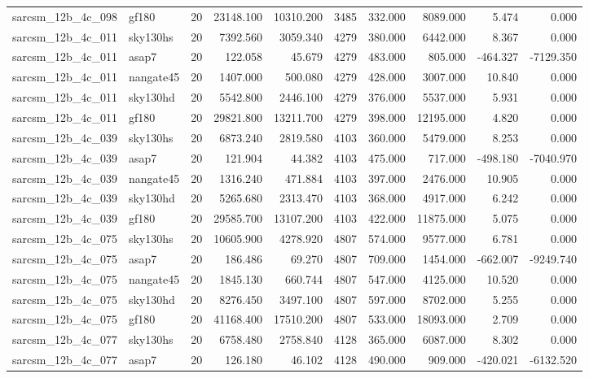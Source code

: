 \begin{tabular}{llrrrrrrrr}
sarcsm\_12b\_4c\_098 & gf180 & 20 & 23148.100 & 10310.200 & 3485 & 332.000 & 8089.000 & 5.474 & 0.000 \\
sarcsm\_12b\_4c\_011 & sky130hs & 20 & 7392.560 & 3059.340 & 4279 & 380.000 & 6442.000 & 8.367 & 0.000 \\
sarcsm\_12b\_4c\_011 & asap7 & 20 & 122.058 & 45.679 & 4279 & 483.000 & 805.000 & -464.327 & -7129.350 \\
sarcsm\_12b\_4c\_011 & nangate45 & 20 & 1407.000 & 500.080 & 4279 & 428.000 & 3007.000 & 10.840 & 0.000 \\
sarcsm\_12b\_4c\_011 & sky130hd & 20 & 5542.800 & 2446.100 & 4279 & 376.000 & 5537.000 & 5.931 & 0.000 \\
sarcsm\_12b\_4c\_011 & gf180 & 20 & 29821.800 & 13211.700 & 4279 & 398.000 & 12195.000 & 4.820 & 0.000 \\
sarcsm\_12b\_4c\_039 & sky130hs & 20 & 6873.240 & 2819.580 & 4103 & 360.000 & 5479.000 & 8.253 & 0.000 \\
sarcsm\_12b\_4c\_039 & asap7 & 20 & 121.904 & 44.382 & 4103 & 475.000 & 717.000 & -498.180 & -7040.970 \\
sarcsm\_12b\_4c\_039 & nangate45 & 20 & 1316.240 & 471.884 & 4103 & 397.000 & 2476.000 & 10.905 & 0.000 \\
sarcsm\_12b\_4c\_039 & sky130hd & 20 & 5265.680 & 2313.470 & 4103 & 368.000 & 4917.000 & 6.242 & 0.000 \\
sarcsm\_12b\_4c\_039 & gf180 & 20 & 29585.700 & 13107.200 & 4103 & 422.000 & 11875.000 & 5.075 & 0.000 \\
sarcsm\_12b\_4c\_075 & sky130hs & 20 & 10605.900 & 4278.920 & 4807 & 574.000 & 9577.000 & 6.781 & 0.000 \\
sarcsm\_12b\_4c\_075 & asap7 & 20 & 186.486 & 69.270 & 4807 & 709.000 & 1454.000 & -662.007 & -9249.740 \\
sarcsm\_12b\_4c\_075 & nangate45 & 20 & 1845.130 & 660.744 & 4807 & 547.000 & 4125.000 & 10.520 & 0.000 \\
sarcsm\_12b\_4c\_075 & sky130hd & 20 & 8276.450 & 3497.100 & 4807 & 597.000 & 8702.000 & 5.255 & 0.000 \\
sarcsm\_12b\_4c\_075 & gf180 & 20 & 41168.400 & 17510.200 & 4807 & 533.000 & 18093.000 & 2.709 & 0.000 \\
sarcsm\_12b\_4c\_077 & sky130hs & 20 & 6758.480 & 2758.840 & 4128 & 365.000 & 6087.000 & 8.302 & 0.000 \\
sarcsm\_12b\_4c\_077 & asap7 & 20 & 126.180 & 46.102 & 4128 & 490.000 & 909.000 & -420.021 & -6132.520 \\

\end{tabular}
